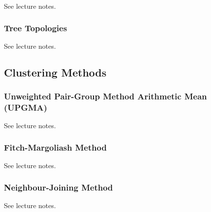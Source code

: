         See lecture notes.\autocite{T5}
        \subsubsection{Tree Topologies}

        See lecture notes.\autocite{T5}
        

    \subsection{Clustering Methods}
       \subsubsection[Unweighted Pair-Group Method Arithmetic Mean]{Unweighted Pair-Group Method Arithmetic Mean (UPGMA)}

       See lecture notes.\autocite{T5}

       \subsubsection{Fitch-Margoliash Method}

       See lecture notes.\autocite{T5}

       \subsubsection{Neighbour-Joining Method}

       See lecture notes.\autocite{T5}

